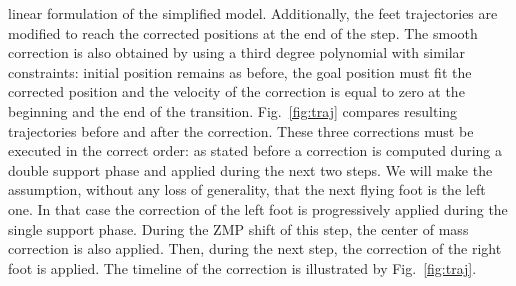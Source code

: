 linear formulation of the simplified model. Additionally, the feet
trajectories are modified to reach the corrected positions at the end
of the step. The smooth correction is also obtained by using a third
degree polynomial with similar constraints: initial position remains
as before, the goal position must fit the corrected position and the
velocity of the correction is equal to zero at the beginning and the
end of the transition. Fig.~\ref{fig:traj} compares resulting
trajectories before and after the correction.
%
%
These three corrections must be executed in the correct order: as
stated before a correction is computed during a double support phase
and applied during the next two steps. We will make the assumption,
without any loss of generality, that the next flying foot is the left
one. In that case the correction of the left foot is progressively
applied during the single support phase. During the ZMP shift of this
step, the center of mass correction is also applied. Then, during the
next step, the correction of the right foot is applied. The timeline
of the correction is illustrated by Fig.~\ref{fig:traj}.
%
%
